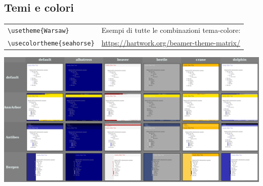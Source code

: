 \subsection{Temi e colori}
  \begin{tabular}{ll}
    \texttt{\textbackslash{}usetheme\{Warsaw\}}& Esempi di tutte le combinazioni tema-colore:\\
    \texttt{\textbackslash{}usecolortheme\{seahorse\}} & \url{https://hartwork.org/beamer-theme-matrix/}
  \end{tabular}
  \includegraphics[width=\textwidth]{img/beamer}

